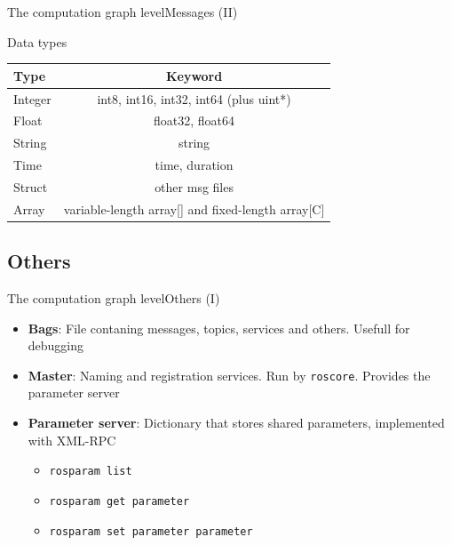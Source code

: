 \documentclass[10pt,compress]{beamer} %
\begin{document}
\begin{frame}{The computation graph level}{Messages (II)}
	\begin{center}
	\large{Data types}
	\vspace{0.3cm}
	\begin{tabular}{lc} \hline
	{\sc Type} & {\sc Keyword} \\ \hline
	Integer & int8, int16, int32, int64 (plus uint*)\\ 
	Float & float32, float64\\ 
	String & string\\ 
	Time & time, duration\\ 
	Struct & other msg files\\ 
	Array &variable-length array[] and fixed-length array[C]\\ \hline
	\end{tabular}
	\end{center}
\end{frame}

\subsection{Others}
\begin{frame}{The computation graph level}{Others (I)}
	\begin{itemize}
	\item \textbf{Bags}: File contaning messages, topics, services and others. Usefull for debugging
	\item \textbf{Master}: Naming and registration services. Run by \texttt{roscore}. Provides the parameter server
	\item \textbf{Parameter server}: Dictionary that stores shared parameters, implemented with XML-RPC
  	\begin{itemize}
		\item \texttt{rosparam list}
		\item \texttt{rosparam get parameter}
		\item \texttt{rosparam set parameter parameter}
	\end{itemize}
	\end{itemize}
\end{frame}
\end{document}
